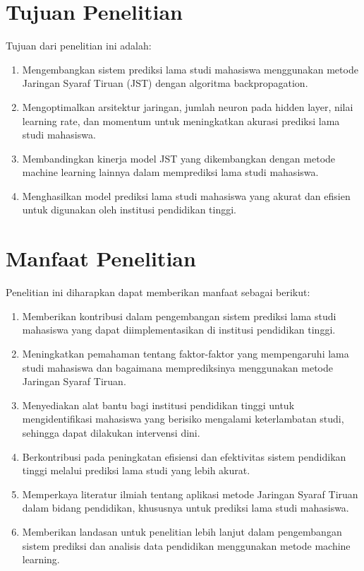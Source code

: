 \section{Tujuan Penelitian}
Tujuan dari penelitian ini adalah:
    \begin{enumerate}
        \item Mengembangkan sistem prediksi lama studi mahasiswa menggunakan metode Jaringan Syaraf Tiruan (JST) dengan algoritma backpropagation.
        \item Mengoptimalkan arsitektur jaringan, jumlah neuron pada hidden layer, nilai learning rate, dan momentum untuk meningkatkan akurasi prediksi lama studi mahasiswa.
        \item Membandingkan kinerja model JST yang dikembangkan dengan metode machine learning lainnya dalam memprediksi lama studi mahasiswa.
        \item Menghasilkan model prediksi lama studi mahasiswa yang akurat dan efisien untuk digunakan oleh institusi pendidikan tinggi.
    \end{enumerate}

\section{Manfaat Penelitian}
Penelitian ini diharapkan dapat memberikan manfaat sebagai berikut:

    \begin{enumerate}
        \item Memberikan kontribusi dalam pengembangan sistem prediksi lama studi mahasiswa yang dapat diimplementasikan di institusi pendidikan tinggi.
        \item Meningkatkan pemahaman tentang faktor-faktor yang mempengaruhi lama studi mahasiswa dan bagaimana memprediksinya menggunakan metode Jaringan Syaraf Tiruan.
        \item Menyediakan alat bantu bagi institusi pendidikan tinggi untuk mengidentifikasi mahasiswa yang berisiko mengalami keterlambatan studi, sehingga dapat dilakukan intervensi dini.
        \item Berkontribusi pada peningkatan efisiensi dan efektivitas sistem pendidikan tinggi melalui prediksi lama studi yang lebih akurat.
        \item Memperkaya literatur ilmiah tentang aplikasi metode Jaringan Syaraf Tiruan dalam bidang pendidikan, khususnya untuk prediksi lama studi mahasiswa.
        \item Memberikan landasan untuk penelitian lebih lanjut dalam pengembangan sistem prediksi dan analisis data pendidikan menggunakan metode machine learning.
    \end{enumerate}

